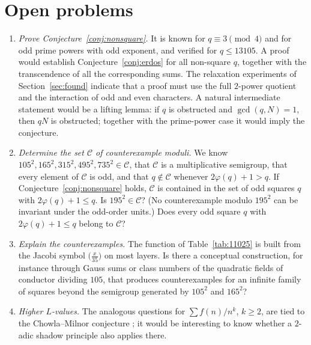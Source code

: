 \documentclass[11pt]{amsart}
\theoremstyle{definition}
\theoremstyle{remark}
\numberwithin{equation}{section}
\begin{document}
\section{Open problems}\label{sec:open}

\begin{enumerate}
\item \emph{Prove Conjecture~\ref{conj:nonsquare}.}
It is known for $q\equiv3\pmod 4$ and for odd prime powers with odd exponent, and verified for $q\le13105$.
A proof would establish Conjecture~\ref{conj:erdos} for all non-square $q$, together with the transcendence of all the corresponding sums.
The relaxation experiments of Section~\ref{sec:found} indicate that a proof must use the full $2$-power quotient and the interaction of odd and even characters.
A natural intermediate statement would be a lifting lemma: if $q$ is obstructed and $\gcd(q,N)=1$, then $qN$ is obstructed; together with the prime-power case it would imply the conjecture.
\item \emph{Determine the set $\mathcal C$ of counterexample moduli.}
We know $105^2,165^2,315^2,495^2,735^2\in\mathcal C$, that $\mathcal C$ is a multiplicative semigroup, that every element of $\mathcal C$ is odd, and that $q\notin\mathcal C$ whenever $2\varphi(q)+1>q$.
If Conjecture~\ref{conj:nonsquare} holds, $\mathcal C$ is contained in the set of odd squares $q$ with $2\varphi(q)+1\le q$.
Is $195^2\in\mathcal C$? (No counterexample modulo $195^2$ can be invariant under the odd-order units.)
Does every odd square $q$ with $2\varphi(q)+1\le q$ belong to $\mathcal C$?
\item \emph{Explain the counterexamples.}
The function of Table~\ref{tab:11025} is built from the Jacobi symbol $\bigl(\frac{x}{35}\bigr)$ on most layers.
Is there a conceptual construction, for instance through Gauss sums or class numbers of the quadratic fields of conductor dividing $105$, that produces counterexamples for an infinite family of squares beyond the semigroup generated by $105^2$ and $165^2$?
\item \emph{Higher $L$-values.}
The analogous questions for $\sum f(n)/n^k$, $k\ge2$, are tied to the Chowla--Milnor conjecture \cite{Bha22}; it would be interesting to know whether a $2$-adic shadow principle also applies there.
\end{enumerate}

\appendix
\end{document}
